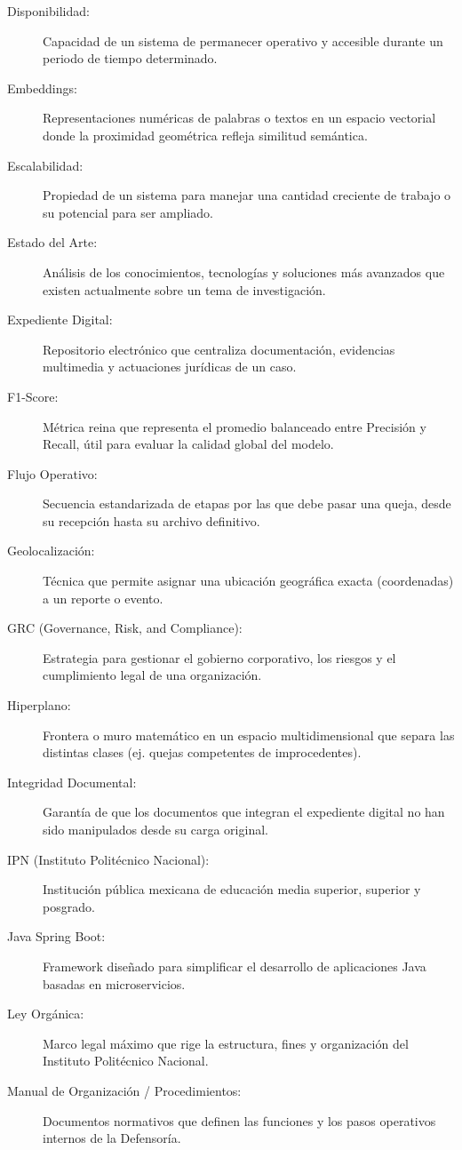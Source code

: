 \begin{description}
    \item[Disponibilidad:] Capacidad de un sistema de permanecer operativo y accesible durante un periodo de tiempo determinado.
     \item[Embeddings:] Representaciones numéricas de palabras o textos en un espacio
    vectorial donde la proximidad geométrica refleja similitud semántica.
    \item[Escalabilidad:] Propiedad de un sistema para manejar una cantidad creciente de trabajo o su potencial para ser ampliado.
    \item[Estado del Arte:] Análisis de los conocimientos, tecnologías y soluciones más avanzados que existen actualmente sobre un tema de investigación.
    \item[Expediente Digital:] Repositorio electrónico que centraliza documentación, evidencias multimedia y actuaciones jurídicas de un caso.
    \item[F1-Score:] Métrica reina que representa el promedio balanceado entre Precisión y Recall, útil para evaluar la calidad global del modelo.
    \item[Flujo Operativo:] Secuencia estandarizada de etapas por las que debe pasar una queja, desde su recepción hasta su archivo definitivo.
    \item[Geolocalización:] Técnica que permite asignar una ubicación geográfica exacta (coordenadas) a un reporte o evento.
    \item[GRC (Governance, Risk, and Compliance):] Estrategia para gestionar el gobierno corporativo, los riesgos y el cumplimiento legal de una organización.
    \item[Hiperplano:] Frontera o muro matemático en un espacio multidimensional que separa las distintas clases (ej. quejas competentes de improcedentes).
    \item[Integridad Documental:] Garantía de que los documentos que integran el expediente digital no han sido manipulados desde su carga original.
    \item[IPN (Instituto Politécnico Nacional):] Institución pública mexicana de educación media superior, superior y posgrado.
    \item[Java Spring Boot:] Framework diseñado para simplificar el desarrollo de aplicaciones Java basadas en microservicios.
    \item[Ley Orgánica:] Marco legal máximo que rige la estructura, fines y organización del Instituto Politécnico Nacional.
    \item[Manual de Organización / Procedimientos:] Documentos normativos que definen las funciones y los pasos operativos internos de la Defensoría.

\end{description}
